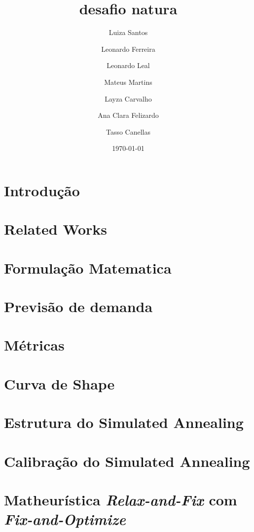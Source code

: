 \documentclass{article}
\title{desafio natura}
\author[1,2]{Luiza Santos}
\author[1,2]{Leonardo Ferreira}
\author[1]{Leonardo Leal}
\author[1,2]{Mateus Martins}
\author[1]{Layza Carvalho}
\author[1]{Ana Clara Felizardo}
\author[1]{Tasso Canellas}
\affil[1]{UNIFESP}
\affil[2]{ITA}
\date{\today}
\numberwithin{equation}{subsection}
\begin{document}
\maketitle

\section{Introdução}
\label{sec:introducao}




\section{Related Works}
\label{sec:related}



\section{Formulação Matematica}
\label{sec:formulacao}



\section{Previsão de demanda}


\label{sec:previsao}

\section{Métricas}
\label{sec:metricas}



\section{Curva de Shape}
\label{sec:shape}



\section{Estrutura do Simulated Annealing}
\label{sec:sa}


\section{Calibração do Simulated Annealing}
\label{sec:calibracao}


\section{Matheurística \textit{Relax-and-Fix} com \textit{Fix-and-Optimize}}
\label{sec:matheuristica}



\clearpage
\printbibliography[title={Referências}]
\end{document}
